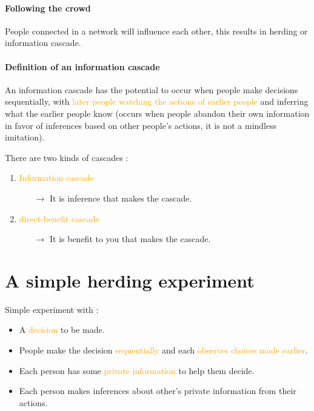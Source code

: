 \paragraph{Following the crowd}

People connected in a network will influence each other, this results in herding or information cascade.

\paragraph{Definition of an information cascade}

An information cascade has the potential to occur when people make decisions sequentially, with \textcolor{orange}{later people watching the actions of earlier people} and inferring what the earlier people know (occurs when people abandon their own information in favor of inferences based on other people's actions, it is not a mindless imitation).

There are two kinds of cascades :
\begin{enumerate}
\item \textcolor{orange}{Information cascade}
	\begin{itemize}
	\item[$\rightarrow$] It is inference that makes the cascade.
	\end{itemize}
\item \textcolor{orange}{direct-benefit cascade}
	\begin{itemize}
	\item[$\rightarrow$] It is benefit to you that makes the cascade.
	\end{itemize}
\end{enumerate}

\section{A simple herding experiment}

Simple experiment with :
\begin{itemize}
\item A \textcolor{orange}{decision} to be made.
\item People make the decision \textcolor{orange}{sequentially} and each \textcolor{orange}{observes choices made earlier}.
\item Each person has some \textcolor{orange}{private information} to help them decide.
\item Each person makes inferences about other's private information from their actions.
\end{itemize}

